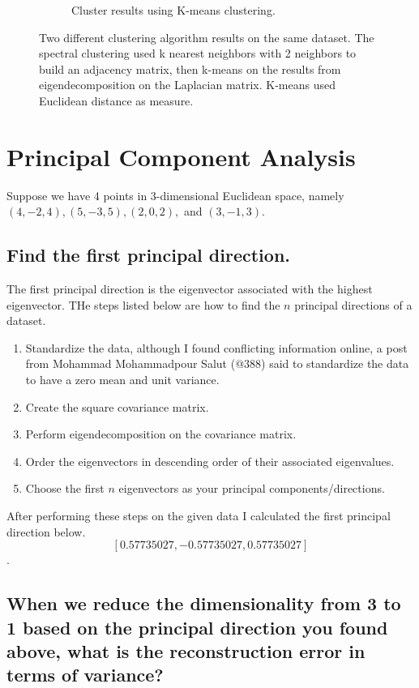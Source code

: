 \documentclass[a4paper]{article}
\begin{document}
\begin{figure}[h]
\begin{subfigure}[b]{0.3\textwidth}
        \caption{Cluster results using K-means clustering.}
        \label{kmeans}
    \end{subfigure}

    \caption{Two different clustering algorithm results on the same dataset.  The spectral clustering used k nearest neighbors with 2 neighbors to build an adjacency matrix, then k-means on the results from eigendecomposition on the Laplacian matrix.  K-means used Euclidean distance as measure. }\label{clusterCompare}
\end{figure}

\section{Principal Component Analysis}
Suppose we have 4 points in 3-dimensional Euclidean space, namely $(4, −2, 4), (5, −3, 5),
(2, 0, 2),$ and $(3, −1, 3).$

\subsection{Find the first principal direction.}

The first principal direction is the eigenvector associated with the highest eigenvector.  THe steps listed below are how to find the $n$ principal directions of a dataset.

\begin{enumerate}
\item Standardize the data, although I found conflicting information online, a post from  Mohammad Mohammadpour Salut (@388) said to standardize the data to have a zero mean and unit variance.
\item Create the square covariance matrix.
\item Perform eigendecomposition on the covariance matrix.
\item Order the eigenvectors in descending order of their associated eigenvalues.
\item Choose the first $n$ eigenvectors as your principal components/directions.
\end{enumerate}

After performing these steps on the given data I calculated the first principal direction below. $$[ 0.57735027, -0.57735027,  0.57735027]$$.

\subsection{When we reduce the dimensionality from 3 to 1 based on the principal direction you found above, what is the reconstruction error in terms of variance?}
\end{document}
